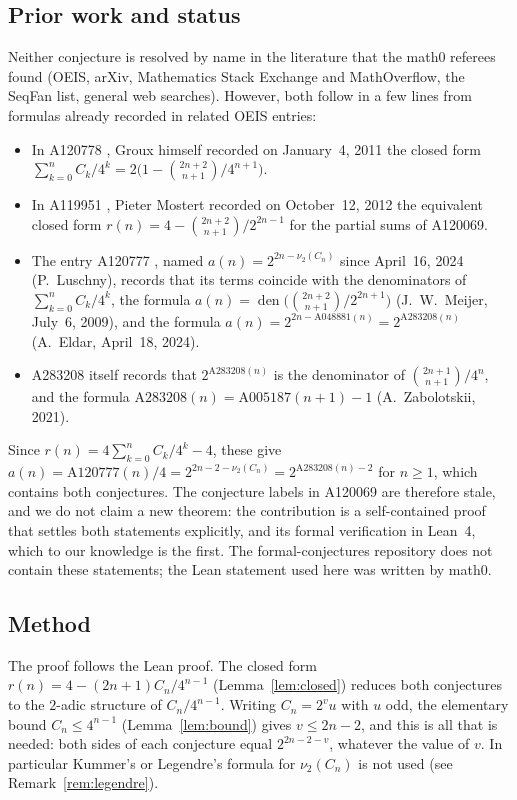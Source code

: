 \documentclass[11pt]{amsart}
\theoremstyle{plain}
\theoremstyle{definition}
\DeclareMathOperator{\den}{den}
\begin{document}
\subsection*{Prior work and status}
Neither conjecture is resolved by name in the literature that the math0 referees found (OEIS, arXiv, Mathematics Stack Exchange and MathOverflow, the SeqFan list, general web searches). However, both follow in a few lines from formulas already recorded in related OEIS entries:
\begin{itemize}
\item In A120778 \cite{A120778}, Groux himself recorded on January~4, 2011 the closed form $\sum_{k=0}^{n}C_k/4^k=2\bigl(1-\binom{2n+2}{n+1}/4^{n+1}\bigr)$.
\item In A119951 \cite{A119951}, Pieter Mostert recorded on October~12, 2012 the equivalent closed form $r(n)=4-\binom{2n+2}{n+1}/2^{2n-1}$ for the partial sums of A120069.
\item The entry A120777 \cite{A120777}, named $a(n)=2^{2n-\nu_2(C_n)}$ since April~16, 2024 (P.~Luschny), records that its terms coincide with the denominators of $\sum_{k=0}^{n}C_k/4^k$, the formula $a(n)=\den\bigl(\binom{2n+2}{n+1}/2^{2n+1}\bigr)$ (J.~W.~Meijer, July~6, 2009), and the formula $a(n)=2^{2n-\mathrm{A048881}(n)}=2^{\mathrm{A283208}(n)}$ (A.~Eldar, April~18, 2024).
\item A283208 \cite{A283208} itself records that $2^{\mathrm{A283208}(n)}$ is the denominator of $\binom{2n+1}{n+1}/4^{n}$, and the formula $\mathrm{A283208}(n)=\mathrm{A005187}(n+1)-1$ (A.~Zabolotskii, 2021).
\end{itemize}
Since $r(n)=4\sum_{k=0}^{n}C_k/4^k-4$, these give $a(n)=\mathrm{A120777}(n)/4=2^{2n-2-\nu_2(C_n)}=2^{\mathrm{A283208}(n)-2}$ for $n\ge1$, which contains both conjectures. The conjecture labels in A120069 are therefore stale, and we do not claim a new theorem: the contribution is a self-contained proof that settles both statements explicitly, and its formal verification in Lean~4, which to our knowledge is the first. The formal-conjectures repository \cite{FC} does not contain these statements; the Lean statement used here was written by math0.

\subsection*{Method}
The proof follows the Lean proof. The closed form $r(n)=4-(2n+1)C_n/4^{n-1}$ (Lemma~\ref{lem:closed}) reduces both conjectures to the $2$-adic structure of $C_n/4^{n-1}$. Writing $C_n=2^vu$ with $u$ odd, the elementary bound $C_n\le 4^{n-1}$ (Lemma~\ref{lem:bound}) gives $v\le 2n-2$, and this is all that is needed: both sides of each conjecture equal $2^{2n-2-v}$, whatever the value of $v$. In particular Kummer's or Legendre's formula for $\nu_2(C_n)$ is not used (see Remark~\ref{rem:legendre}).
\end{document}
